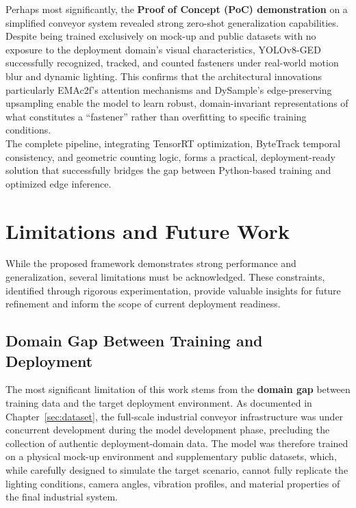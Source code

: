 Perhaps most significantly, the \textbf{Proof of Concept (PoC) demonstration} on a simplified conveyor system revealed strong zero-shot generalization capabilities. Despite being trained exclusively on mock-up and public datasets with no exposure to the deployment domain's visual characteristics, YOLOv8-GED successfully recognized, tracked, and counted fasteners under real-world motion blur and dynamic lighting. This confirms that the architectural innovations particularly EMAc2f's attention mechanisms and DySample's edge-preserving upsampling enable the model to learn robust, domain-invariant representations of what constitutes a ``fastener'' rather than overfitting to specific training conditions.\\

The complete pipeline, integrating TensorRT optimization, ByteTrack temporal consistency, and geometric counting logic, forms a practical, deployment-ready solution that successfully bridges the gap between Python-based training and optimized edge inference.

\section{Limitations and Future Work}

While the proposed framework demonstrates strong performance and generalization, several limitations must be acknowledged. These constraints, identified through rigorous experimentation, provide valuable insights for future refinement and inform the scope of current deployment readiness.

\subsection{Domain Gap Between Training and Deployment}

The most significant limitation of this work stems from the \textbf{domain gap} between training data and the target deployment environment. As documented in Chapter~\ref{sec:dataset}, the full-scale industrial conveyor infrastructure was under concurrent development during the model development phase, precluding the collection of authentic deployment-domain data. The model was therefore trained on a physical mock-up environment and supplementary public datasets, which, while carefully designed to simulate the target scenario, cannot fully replicate the lighting conditions, camera angles, vibration profiles, and material properties of the final industrial system.\\

